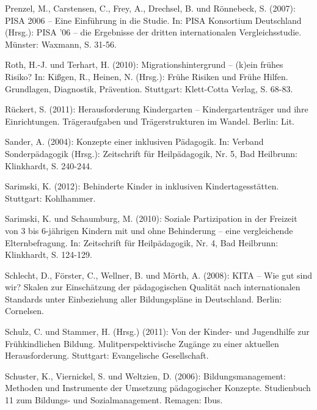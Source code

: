 Prenzel, M., Carstensen, C., Frey, A., Drechsel, B. und Rönnebeck, S. (2007): PISA 2006 – Eine Einführung in die Studie. In: PISA Konsortium Deutschland (Hrsg.): PISA '06 – die Ergebnisse der dritten internationalen Vergleichsstudie. Münster: Waxmann, S. 31-56.

Roth, H.-J. und Terhart, H. (2010): Migrationshintergrund -- (k)ein frühes Risiko? In: Kißgen, R., Heinen, N. (Hrsg.): Frühe Risiken und Frühe Hilfen. Grundlagen, Diagnostik, Prävention. Stuttgart: Klett-Cotta Verlag, S. 68-83.

Rückert, S. (2011): Herausforderung Kindergarten -- Kindergartenträger und ihre Einrichtungen. Trägeraufgaben und Trägerstrukturen im Wandel. Berlin: Lit.
	
Sander, A. (2004): Konzepte einer inklusiven Pädagogik. In: Verband Sonderpädagogik (Hrsg.): Zeitschrift für Heilpädagogik, Nr. 5, Bad Heilbrunn: Klinkhardt, S. 240-244.


Sarimski, K. (2012): Behinderte Kinder in inklusiven Kindertagesstätten. Stuttgart: Kohlhammer. 

Sarimski, K. und Schaumburg, M. (2010): Soziale Partizipation in der Freizeit von 3 bis 6-jährigen Kindern mit und ohne Behinderung -- eine vergleichende Elternbefragung. In: Zeitschrift für Heilpädagogik, Nr. 4, Bad Heilbrunn: Klinkhardt, S. 124-129.


Schlecht, D., Förster, C., Wellner, B. und Mörth, A. (2008): KITA – Wie gut sind wir? Skalen zur Einschätzung der pädagogischen Qualität nach internationalen Standards unter Einbeziehung aller Bildungspläne in Deutschland. Berlin: Cornelsen. 

Schulz, C. und Stammer, H. (Hrsg.) (2011): Von der Kinder- und Jugendhilfe zur Frühkindlichen Bildung. Mulitperspektivische Zugänge zu einer aktuellen Herausforderung. Stuttgart: Evangelische Gesellschaft.

Schuster, K., Viernickel, S. und Weltzien, D. (2006): Bildungsmanagement: Methoden und Instrumente der Umsetzung pädagogischer Konzepte. Studienbuch 11 zum Bildungs- und Sozialmanagement. Remagen: Ibus.

